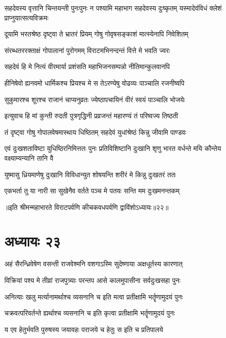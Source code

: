 \threelineshloka
{सहदेवस्य वृत्तानि चिन्तयन्ती पुनःपुनः}
{न पश्यामि महाभाग सहदेवस्य दुःष्कृतम्}
{यस्मादेवंविधं क्लेशं प्राप्नुयात्सत्यविक्रमः}


\twolineshloka
{दूयामि भरतश्रेष्ठ दृष्ट्वा ते भ्रातरं प्रियम्}
{गोषु गोवृषसङ्काशं मात्स्येनापि निवेशितम्}


\twolineshloka
{संरब्धतररक्ताक्षं गोपालानां पुरोगमम्}
{विराटमभिनन्दन्तं वित्ते मे भवति ज्वरः}


\twolineshloka
{सहदेवं हि मे नित्यं वीरमार्या प्रशंसति}
{महाभिजनसम्पन्नो नीतिमान्कुलवानपि}


\twolineshloka
{हीनिषेवो ह्यनवमो धार्मिकश्च प्रियश्च मे}
{स तेऽरण्येषु वोढव्यः पाञ्चालि रजनीष्वपि}


\twolineshloka
{सुकुमारश्च शूरश्च राजानं चाप्यनुव्रतः}
{ज्येष्ठापचायिनं वीरं स्वयं पाञ्चालि भोजयेः}


\twolineshloka
{इत्युवाच हि मां कुन्ती रुदती पुत्रगृद्धिनी}
{प्रव्रजन्तं महारण्यं तं परिष्वज्य तिष्ठती}


\twolineshloka
{तं दृष्ट्वा गोषु गोपालवेषमास्थाय धिष्ठितम्}
{सहदेवं युधांश्रेष्ठं किन्नु जीवामि पाण्डवः}


\onelineshloka
{एवं दुःखशताविष्टा युधिष्ठिरनिमित्ततः}
\twolineshloka
{पुनः प्रतिविशिष्टानि दुःखानि शृणु भारत}
{वर्धन्ते मयि कौन्तेय वक्ष्याम्यन्यानि तानि वै}


\twolineshloka
{युष्मासु ध्रियमाणेषु दुःखानि विविधान्युत}
{शोषयन्ति शरीरं मे किन्नु दुःखतरं ततः}


\twolineshloka
{एकभर्ता तु या नारी सा सुखेनैव वर्तते}
{पञ्च मे पतयः सन्ति मम दुःखमनन्तकम्}

॥इति श्रीमन्महाभारते विराटपर्वणि कीचकवधपर्वणि द्वाविंशोऽध्यायः॥२२॥

\chapter{अध्यायः २३}


\twolineshloka
{अहं सैरन्ध्रिवेषेण वसन्ती राजवेश्मनि}
{वशगाऽस्मि सुदेष्णाया अक्षधूर्तस्य कारणात्}


\twolineshloka
{विक्रियां पश्य मे तीव्रां राजपुत्र्याः परन्तप}
{आसे कालमुपासीना सर्वदुःखसहा पुनः}


\twolineshloka
{अनित्याः खलु मर्त्यानामर्थाश्च व्यसनानि च}
{इति मत्वा प्रतीक्षामि भर्तॄणामुदयं पुनः}


\twolineshloka
{चक्रवत्परिवर्तन्ते ह्यर्थाश्च व्यसनानि च}
{इति कृत्वा प्रतीक्षामि भर्तॄणामुदयं पुनः}


\twolineshloka
{य एव हेतुर्भवति पुरुषस्य जयावहः}
{पराजये च हेतुः स इति च प्रतिपालये}


